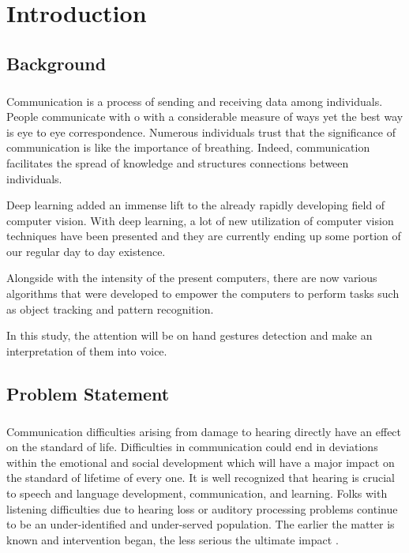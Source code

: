 \documentclass[12pt]{report}
\begin{document}
    \setcounter{page}{2}                    
    \tableofcontents{}
    \listoffigures
    \listoftables
    \newpage

    \chapter{Introduction} 
        \section{Background}
            \paragraph{}
                Communication is a process of sending and receiving data among individuals. 
                People communicate with o with a considerable measure of ways yet the best way is eye to eye correspondence.
                Numerous individuals trust that the significance of communication 
                is like the importance of breathing. Indeed, communication facilitates the spread of knowledge
                and structures connections between individuals.
            
                Deep learning added an immense lift to the already rapidly developing field of computer vision.
                With deep learning, a lot of new utilization of computer vision techniques have been presented
                and they are currently ending up some portion of our regular day to day existence.
            
                Alongside with the intensity of the present computers, there are now various algorithms that were developed 
                to empower the computers to perform tasks such as object tracking and pattern recognition. 
                
                In this study, the attention will be on hand gestures detection and make an interpretation of them into voice.

        \section{Problem Statement}
            \paragraph{}
                Communication difficulties arising from damage to hearing
                directly have an effect on the standard of life. Difficulties in communication could
                end in deviations within the emotional and social development which
                will have a major impact on the standard of lifetime of every one.
                It is well recognized that hearing is crucial to speech and language development, communication, and learning.
                Folks with listening difficulties due to hearing loss or auditory processing problems
                continue to be an under-identified and under-served population. The
                earlier the matter is known and intervention began, the less
                serious the ultimate impact \cite{Frajtag12017}.
\end{document}
